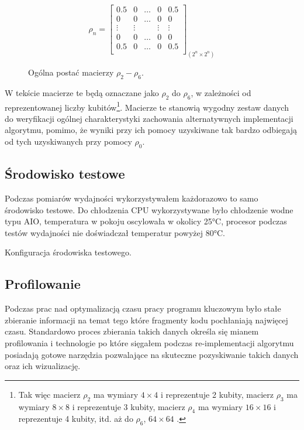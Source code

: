 \documentclass[11pt, a4paper]{article}
\begin{document}
\begin{sloppypar}
    \FloatBarrier
    \begin{figure}[ht]
      \centering
      \setcounter{MaxMatrixCols}{33}
      \[
        \rho_{n}=
        \begin{bmatrix}
          0.5    & 0      & \hdots & 0      & 0.5    \\
          0      & 0      & \hdots & 0      & 0      \\
          \vdots & \vdots &        & \vdots & \vdots \\
          0      & 0      & \hdots & 0      & 0      \\
          0.5    & 0      & \hdots & 0      & 0.5    \\
        \end{bmatrix}_{(2^{n}\times2^{n})}
      \]
      \caption{Ogólna postać macierzy $\rho_{2}- \rho_{6}$.}
      \label{rho-2-6}
    \end{figure}

    \FloatBarrier

    W tekście macierze te będą oznaczane jako $\rho_{2}$ do $\rho_{6}$, w zależności od
    reprezentowanej liczby kubitów\footnote{Tak więc macierz $\rho_{2}$ ma wymiary $4\times
    4$ i reprezentuje 2 kubity, macierz $\rho_{3}$ ma wymiary $8\times8$ i reprezentuje
    3 kubity, macierz $\rho_{4}$ ma wymiary $16\times16$ i reprezentuje 4 kubity, itd. aż
    do $\rho_{6}$, $64\times64$ .}. Macierze te stanowią wygodny zestaw danych do
    weryfikacji ogólnej charakterystyki zachowania alternatywnych implementacji
    algorytmu, pomimo, że wyniki przy ich pomocy uzyskiwane tak bardzo odbiegają od tych
    uzyskiwanych przy pomocy $\rho_{0}$.

    \subsection{Środowisko testowe}
    Podczas pomiarów wydajności wykorzystywałem każdorazowo to samo środowisko testowe. Do
    chłodzenia CPU wykorzystywane było chłodzenie wodne typu AIO, temperatura w pokoju
    oscylowała w okolicy 25°C, procesor podczas testów wydajności nie doświadczał temperatur
    powyżej 80°C.

    \FloatBarrier
    \begin{table}[ht]
      \centering
      
      \caption{Konfiguracja środowiska testowego.}
      \label{pc-configuration}
    \end{table}
    \FloatBarrier

    \subsection{Profilowanie}
    Podczas prac nad optymalizacją czasu pracy programu kluczowym było stałe zbieranie
    informacji na temat tego które fragmenty kodu pochłaniają najwięcej czasu. Standardowo
    proces zbierania takich danych określa się mianem profilowania i technologie po które
    sięgałem podczas re-implementacji algorytmu posiadają gotowe narzędzia pozwalające na
    skuteczne pozyskiwanie takich danych oraz ich wizualizację.


\end{sloppypar}
\end{document}
